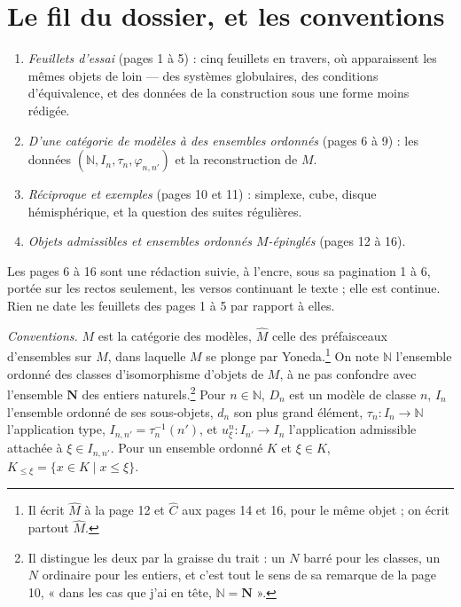 \documentclass[11pt,a4paper]{article}
\begin{document}
\section*{Le fil du dossier, et les conventions}

\begin{enumerate}
\item[1.] \emph{Feuillets d'essai} (pages 1 à 5) : cinq feuillets en travers,
où apparaissent les mêmes objets de loin --- des systèmes globulaires, des
conditions d'équivalence, et des données de la construction sous une forme
moins rédigée.
\item[2.] \emph{D'une catégorie de modèles à des ensembles ordonnés} (pages 6 à
9) : les données $(\mathbb{N}, I_{n}, \tau_{n}, \varphi_{n,n'})$ et la
reconstruction de $M$.
\item[3.] \emph{Réciproque et exemples} (pages 10 et 11) : simplexe, cube,
disque hémisphérique, et la question des suites régulières.
\item[4.] \emph{Objets admissibles et ensembles ordonnés $M$-épinglés} (pages
12 à 16).
\end{enumerate}

Les pages 6 à 16 sont une rédaction suivie, à l'encre, sous sa pagination 1 à 6,
portée sur les rectos seulement, les versos continuant le texte ; elle est
continue. Rien ne date les feuillets des pages 1 à 5 par rapport à elles.

\emph{Conventions.} $M$ est la catégorie des modèles, $\widehat{M}$ celle des
préfaisceaux d'ensembles sur $M$, dans laquelle $M$ se plonge par
Yoneda.\footnote{Il écrit $\widehat{M}$ à la page 12 et $\widehat{C}$ aux pages
14 et 16, pour le même objet ; on écrit partout $\widehat{M}$.} On note
$\mathbb{N}$ l'ensemble ordonné des classes d'isomorphisme d'objets de $M$, à
ne pas confondre avec l'ensemble $\mathbf{N}$ des entiers naturels.\footnote{Il
distingue les deux par la graisse du trait : un $N$ barré pour les classes, un
$N$ ordinaire pour les entiers, et c'est tout le sens de sa remarque de la page
10, « dans les cas que j'ai en tête, $\mathbb{N} = \mathbf{N}$ ».} Pour
$n \in \mathbb{N}$, $D_{n}$ est un modèle de classe $n$, $I_{n}$ l'ensemble
ordonné de ses sous-objets, $d_{n}$ son plus grand élément,
$\tau_{n} : I_{n} \to \mathbb{N}$ l'application type,
$I_{n,n'} = \tau_{n}^{-1}(n')$, et $u^{n}_{\xi} : I_{n'} \to I_{n}$
l'application admissible attachée à $\xi \in I_{n,n'}$. Pour un ensemble ordonné
$K$ et $\xi \in K$, $K_{\leq \xi} = \{x \in K \mid x \leq \xi\}$.
\end{document}
